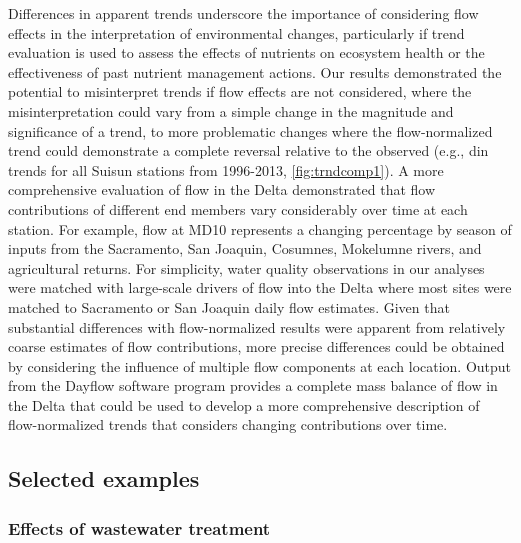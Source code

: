 \documentclass[journal = esthag, manuscript = article]{achemso}\usepackage[]{graphicx}\usepackage[]{color}
\begin{document}
Differences in apparent trends underscore the importance of considering flow effects in the interpretation of environmental changes, particularly if trend evaluation is used to assess the effects of nutrients on ecosystem health or the effectiveness of past nutrient management actions.  Our results demonstrated the potential to misinterpret trends if flow effects are not considered, where the misinterpretation could vary from a simple change in the magnitude and significance of a trend, to more problematic changes where the flow-normalized trend could demonstrate a complete reversal relative to the observed (e.g., \ac{din} trends for all Suisun stations from 1996-2013, \cref{fig:trndcomp1}). A more comprehensive evaluation of flow in the Delta demonstrated that flow contributions of different end members vary considerably over time at each station\cite{Novick15}.  For example, flow at MD10 represents a changing percentage by season of inputs from the Sacramento, San Joaquin, Cosumnes, Mokelumne rivers, and agricultural returns.   For simplicity, water quality observations in our analyses were matched with large-scale drivers of flow into the Delta where most sites were matched to Sacramento or San Joaquin daily flow estimates.  Given that substantial differences with flow-normalized results were apparent from relatively coarse estimates of flow contributions, more precise differences could be obtained by considering the influence of multiple flow components at each location. Output from the Dayflow software program\cite{IEP16} provides a complete mass balance of flow in the Delta that could be used to develop a more comprehensive description of flow-normalized trends that considers changing contributions over time.  

\subsection{Selected examples}

\subsubsection{Effects of wastewater treatment}
\end{document}
